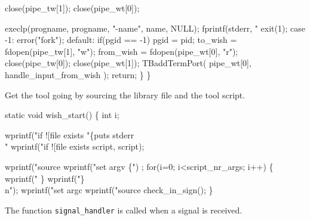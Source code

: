          close(pipe_tw[1]);
         close(pipe_wt[0]);
         
         execlp(progname, progname, "-name", name, NULL);
         fprintf(stderr, "%
         exit(1);
      case -1:
         error("fork");
      default:
         if(pgid == -1)
            pgid = pid;
         to_wish = fdopen(pipe_tw[1], "w");
         from_wish = fdopen(pipe_wt[0], "r");
         close(pipe_tw[0]);
         close(pipe_wt[1]);
         TBaddTermPort( pipe_wt[0], handle_input_from_wish );
         return;
   \}
\}
\nwendcode{}\nwdocspar


Get the tool going by sourcing the library file and the tool script.

\nwenddocs{}\endmoddef\let\nwnotused=\nwoutput{}\nwstartdeflinemarkup{}\nwenddeflinemarkup
static void wish_start()
\{
   int i;

   wprintf("if ![file exists %
                      "\{puts stderr \\"%
   wprintf("if ![file exists %
                                                        script, script);
   
   wprintf("source %
   wprintf("set argv \{") ;
   for(i=0; i<script_nr_args; i++) \{
     wprintf("%
   \}
   wprintf("\}\\n");
   wprintf("set argc %
   wprintf("source %
   check_in_sign();
\}
\nwendcode{}\nwdocspar


The function {\tt signal\_handler} is called when a signal is
received.

